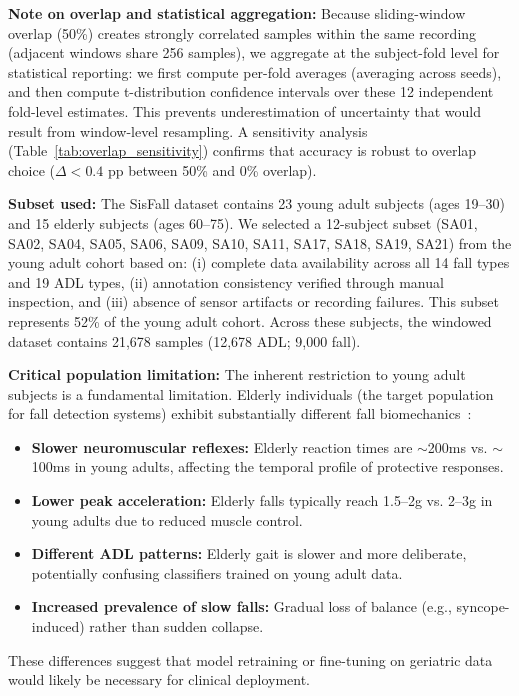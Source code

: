 \documentclass{article}
\begin{document}
\textbf{Note on overlap and statistical aggregation:} Because sliding-window overlap (50\%) creates strongly correlated samples within the same recording (adjacent windows share 256 samples), we aggregate at the subject-fold level for statistical reporting: we first compute per-fold averages (averaging across seeds), and then compute t-distribution confidence intervals over these 12 independent fold-level estimates. This prevents underestimation of uncertainty that would result from window-level resampling. A sensitivity analysis (Table~\ref{tab:overlap_sensitivity}) confirms that accuracy is robust to overlap choice ($\Delta < 0.4$ pp between 50\% and 0\% overlap).

\textbf{Subset used:} The SisFall dataset contains 23 young adult subjects (ages 19--30) and 15 elderly subjects (ages 60--75). We selected a 12-subject subset (SA01, SA02, SA04, SA05, SA06, SA09, SA10, SA11, SA17, SA18, SA19, SA21) from the young adult cohort based on: (i) complete data availability across all 14 fall types and 19 ADL types, (ii) annotation consistency verified through manual inspection, and (iii) absence of sensor artifacts or recording failures. This subset represents 52\% of the young adult cohort. Across these subjects, the windowed dataset contains 21,678 samples (12,678 ADL; 9,000 fall).

\textbf{Critical population limitation:} The inherent restriction to young adult subjects is a fundamental limitation. Elderly individuals (the target population for fall detection systems) exhibit substantially different fall biomechanics~\cite{Bourke2007Threshold,Igual2013Challenges}:
\begin{itemize}
    \item \textbf{Slower neuromuscular reflexes:} Elderly reaction times are $\sim$200ms vs. $\sim$100ms in young adults, affecting the temporal profile of protective responses.
    \item \textbf{Lower peak acceleration:} Elderly falls typically reach 1.5--2g vs. 2--3g in young adults due to reduced muscle control.
    \item \textbf{Different ADL patterns:} Elderly gait is slower and more deliberate, potentially confusing classifiers trained on young adult data.
    \item \textbf{Increased prevalence of slow falls:} Gradual loss of balance (e.g., syncope-induced) rather than sudden collapse.
\end{itemize}
These differences suggest that model retraining or fine-tuning on geriatric data would likely be necessary for clinical deployment.
\end{document}
